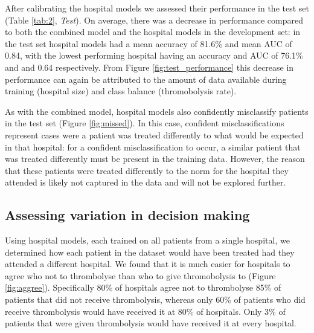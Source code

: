 \documentclass[12pt,a4paper, pdftex]{elsarticle}
\begin{document}
After calibrating the hospital models we assessed their performance in the test set (Table \ref{tab:2}, {\it Test}). On average, there was a decrease in performance compared to both the combined model and the hospital models in the development set: in the test set hospital models had a mean accuracy of 81.6\% and mean AUC of 0.84, with the lowest performing hospital having an accuracy and AUC of 76.1\% and and 0.64 respectively. From Figure \ref{fig:test_performance} this decrease in performance can again be attributed to the amount of data available during training (hospital size) and class balance (thromobolysis rate). 

As with the combined model, hospital models also confidently misclassify patients in the test set (Figure \ref{fig:missed}). In this case, confident misclassifications represent cases were a patient was treated differently to what would be expected in that hospital: for a confident misclassification to occur, a similar patient that was treated differently must be present in the training data. However, the reason that these patients were treated differently to the norm for the hospital they attended is likely not captured in the data and will not be explored further.

\subsection{Assessing variation in decision making}

Using hospital models, each trained on all patients from a single hospital, we determined how each patient in the dataset would have been treated had they attended a different hospital. We found that it is much easier for hospitals to agree who not to thrombolyse than who to give thromobolysis to (Figure \ref{fig:aggree}). Specifically 80\% of hospitals agree not to thrombolyse 85\% of patients that did not receive thrombolysis, whereas only 60\% of patients who did receive thrombolysis would have received it at 80\% of hospitals. Only 3\% of patients that were given thrombolysis would have received it at every hospital.
\end{document}
